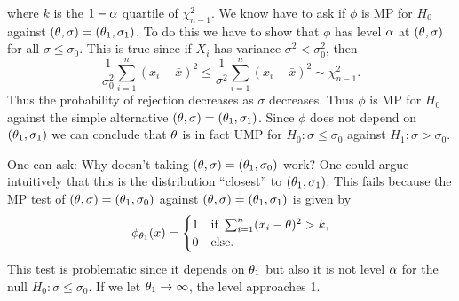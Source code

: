 where $k$ is the $1-{\alpha}$ quartile of $\chi_{n-1}^2$. We know have to ask if $\phi$ is MP for $H_0$ against $({\theta},\sigma)=({\theta}_1,\sigma_1)$. To do this we have to show that $\phi$ has level ${\alpha}$ at $({\theta},\sigma)$ for all $\sigma \le \sigma_0$. This is true since if $X_i$ has variance $\sigma^2 < \sigma_0^2$, then 
\[\frac{1}{\sigma_0^2}\sum_{i=1}^n (x_i-\bar{x})^2 \le \frac{1}{\sigma^2}\sum_{i=1}^n (x_i-\bar{x})^2 \sim \chi^2_{n-1}.\]
Thus the probability of rejection decreases as $\sigma$ decreases. Thus $\phi$ is MP for $H_0$ against the simple alternative $({\theta},\sigma)=({\theta}_1,\sigma_1)$. Since $\phi$ does not depend on $({\theta}_1,\sigma_1)$ we can conclude that ${\theta}$ is in fact UMP for $H_0 : \sigma \le \sigma_0$ against $H_1 : \sigma > \sigma_0$. 
\begin{remark}
    One can ask: Why doesn't taking $({\theta},\sigma) = ({\theta}_1,\sigma_0)$ work? One could argue intuitively that this is the distribution ``closest'' to $({\theta}_1,\sigma_1)$. This fails because the MP test of $({\theta},\sigma) = ({\theta}_1,\sigma_0)$ against $({\theta},\sigma)=({\theta}_1,\sigma_1)$ is given by 
    \[\phi_{{\theta}_1}(x) = \begin{cases}
        1 & \text{if } \sum_{i=1}^n (x_i-{\theta})^2 > k,\\
        0 & \text{else}.
    \end{cases} \]
    This test is problematic since it depends on ${\theta}_1$ but also it is not level ${\alpha}$ for the null $H_0 : \sigma \le \sigma_0$. If we let ${\theta}_1 \to \infty$, the level approaches 1.
\end{remark}
